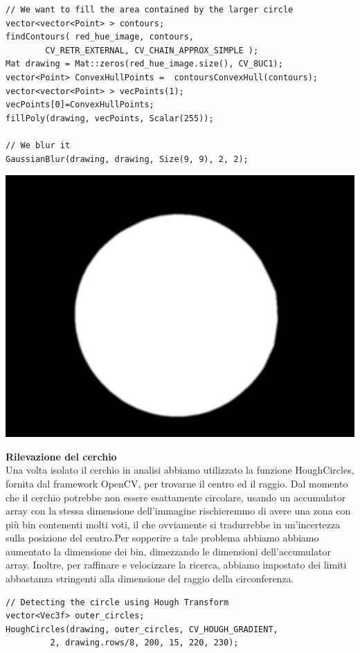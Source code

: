 \begin{lstlisting}
// We want to fill the area contained by the larger circle
vector<vector<Point> > contours;
findContours( red_hue_image, contours, 
		CV_RETR_EXTERNAL, CV_CHAIN_APPROX_SIMPLE );
Mat drawing = Mat::zeros(red_hue_image.size(), CV_8UC1);
vector<Point> ConvexHullPoints =  contoursConvexHull(contours);
vector<vector<Point> > vecPoints(1);
vecPoints[0]=ConvexHullPoints;
fillPoly(drawing, vecPoints, Scalar(255));

// We blur it
GaussianBlur(drawing, drawing, Size(9, 9), 2, 2);
\end{lstlisting}

\vspace{0.3cm}

\begin{centering}
\includegraphics[width=\textwidth]{img/pieno.png}
\end{centering}

\newpage

\noindent
\textbf{Rilevazione del cerchio}
\\ 
Una volta isolato il cerchio in analisi abbiamo utilizzato la funzione HoughCircles, fornita dal framework OpenCV, per trovarne il centro ed il raggio. Dal momento che il cerchio potrebbe non essere esattamente circolare, usando un accumulator array con la stessa dimensione dell’immagine rischieremmo di avere una zona con più bin contenenti molti voti, il che ovviamente si tradurrebbe in un’incertezza sulla posizione del centro.Per sopperire a tale problema abbiamo abbiamo aumentato la dimensione dei bin, dimezzando le dimensioni dell’accumulator array. Inoltre, per raffinare e velocizzare la ricerca, abbiamo impostato dei limiti abbastanza stringenti alla dimensione del raggio della circonferenza. 
\\
\begin{lstlisting}
// Detecting the circle using Hough Transform
vector<Vec3f> outer_circles;
HoughCircles(drawing, outer_circles, CV_HOUGH_GRADIENT,
		 2, drawing.rows/8, 200, 15, 220, 230); 
\end{lstlisting}

